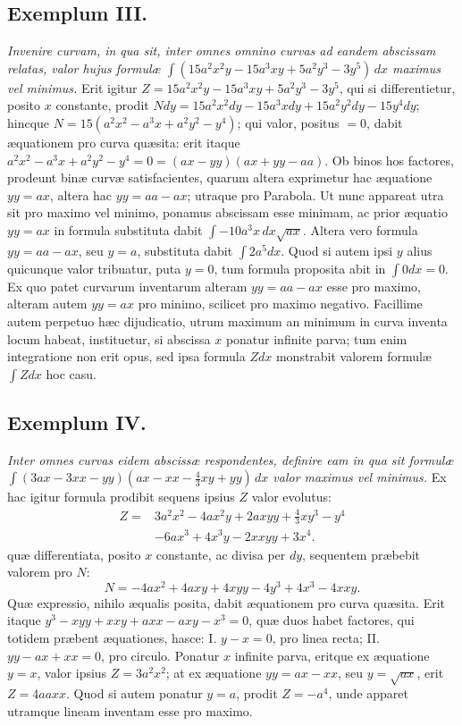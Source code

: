 \subsection*{Exemplum III.}
\textit{Invenire curvam, in qua sit, inter omnes omnino curvas ad eandem abscissam relatas, valor hujus formulæ $\int(15a^2x^2y-15a^3xy+5a^2y^3-3y^5)\,dx$ maximus vel minimus.}
Erit igitur $Z=15a^2x^2y-15a^3xy+5a^2y^3-3y^5$, qui si differentietur, posito $x$ constante, prodit $Ndy=15a^2x^2dy-15a^3xdy+15a^2y^2dy-15y^4dy$; hincque $N=15(a^2x^2-a^3x+a^2y^2-y^4)$; qui valor, positus $=0$, dabit æquationem pro curva quæsita: erit itaque $a^2x^2-a^3x+a^2y^2-y^4=0=(ax-yy)(ax+yy-aa)$. Ob binos hos factores, prodeunt binæ curvæ satisfacientes, quarum altera exprimetur hac æquatione $yy=ax$, altera hac $yy=aa-ax$; utraque pro Parabola. Ut nunc appareat utra sit pro maximo vel minimo, ponamus abscissam esse minimam, ac prior æquatio $yy=ax$ in formula substituta dabit $\int -10a^3x\,dx\sqrt{ax}$. Altera vero formula $yy=aa-ax$, seu $y=a$, substituta dabit $\int 2a^5dx$. Quod si autem ipsi $y$ alius quicunque valor tribuatur, puta $y=0$, tum formula proposita abit in $\int0dx=0$. Ex quo patet curvarum inventarum alteram $yy=aa-ax$ esse pro maximo, alteram autem $yy=ax$ pro minimo, scilicet pro maximo negativo. Facillime autem perpetuo hæc dijudicatio, utrum maximum an minimum in curva inventa locum habeat, instituetur, si abscissa $x$ ponatur infinite parva; tum enim integratione non erit opus, sed ipsa formula $Zdx$ monstrabit valorem formulæ $\int Zdx$ hoc casu.

\subsection*{Exemplum IV.}
\textit{Inter omnes curvas eidem abscissæ respondentes, definire eam in qua sit formulæ $\int(3ax-3xx-yy)(ax-xx-\frac43xy+yy)\,dx$ valor maximus vel minimus.}
Ex hac igitur formula prodibit sequens ipsius $Z$ valor evolutus:
\[
\begin{aligned}
Z={}&3a^2x^2-4ax^2y+2axyy+\tfrac43xy^3-y^4\\
&-6ax^3+4x^3y-2xxyy+3x^4.
\end{aligned}
\]
quæ differentiata, posito $x$ constante, ac divisa per $dy$, sequentem præbebit valorem pro $N$:
\[
N=-4ax^2+4axy+4xyy-4y^3+4x^3-4xxy.
\]
Quæ expressio, nihilo æqualis posita, dabit æquationem pro curva quæsita. Erit itaque $y^3-xyy+xxy+axx-axy-x^3=0$, quæ duos habet factores, qui totidem præbent æquationes, hasce: I. $y-x=0$, pro linea recta; II. $yy-ax+xx=0$, pro circulo. Ponatur $x$ infinite parva, eritque ex æquatione $y=x$, valor ipsius $Z=3a^2x^2$; at ex æquatione $yy=ax-xx$, seu $y=\sqrt{ax}$, erit $Z=4aaxx$. Quod si autem ponatur $y=a$, prodit $Z=-a^4$, unde apparet utramque lineam inventam esse pro maximo.

